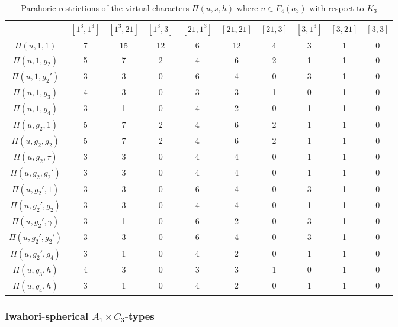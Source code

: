 \begin{landscape}
    \newpage
    \begin{table}[!ht]
        \centering
        {\small
        \begin{tabular}{|c|ccccccccc|}
            \hline
        & $[1^3,1^3]$ & $[1^3,21]$ & $[1^3,3]$ & $[21,1^3]$ & $[21,21]$ & $[21,3]$ & $[3,1^3]$ & $[3,21]$ & $[3,3]$ \\\hline
        $\Pi(u,1,1)$ & 7 & 15 & 12 & 6 & 12 & 4 & 3 & 1 & 0 \\
        $\Pi(u,1,g_2)$ & 5 & 7 & 2 & 4 & 6 & 2 & 1 & 1 & 0 \\
        $\Pi(u,1,g_2')$ & 3 & 3 & 0 & 6 & 4 & 0 & 3 & 1 & 0 \\
        $\Pi(u,1,g_3)$ & 4 & 3 & 0 & 3 & 3 & 1 & 0 & 1 & 0 \\
        $\Pi(u,1,g_4)$ & 3 & 1 & 0 & 4 & 2 & 0 & 1 & 1 & 0 \\\hline
        $\Pi(u,g_2,1)$ & 5 & 7 & 2 & 4 & 6 & 2 & 1 & 1 & 0 \\
        $\Pi(u,g_2,g_2)$ & 5 & 7 & 2 & 4 & 6 & 2 & 1 & 1 & 0 \\
        $\Pi(u,g_2,\tau)$ & 3 & 3 & 0 & 4 & 4 & 0 & 1 & 1 & 0 \\
        $\Pi(u,g_2,g_2')$ & 3 & 3 & 0 & 4 & 4 & 0 & 1 & 1 & 0 \\\hline
        $\Pi(u,g_2',1)$ & 3 & 3 & 0 & 6 & 4 & 0 & 3 & 1 & 0 \\
        $\Pi(u,g_2',g_2)$ & 3 & 3 & 0 & 4 & 4 & 0 & 1 & 1 & 0 \\
        $\Pi(u,g_2',\gamma)$ & 3 & 1 & 0 & 6 & 2 & 0 & 3 & 1 & 0 \\
        $\Pi(u,g_2',g_2')$  & 3 & 3 & 0 & 6 & 4 & 0 & 3 & 1 & 0 \\
        $\Pi(u,g_2',g_4)$  & 3 & 1 & 0 & 4 & 2 & 0 & 1 & 1 & 0 \\\hline
        $\Pi(u,g_3,h)$ & {4} & {3} & 0 & {3} & {3} & 1 & 0 & 1 & 0 \\\hline
        $\Pi(u,g_4,h)$ & 3 & 1 & 0 & 4 & 2 & 0 & 1 & 1 & 0 \\\hline
        \end{tabular}
        }
        \caption{Parahoric restrictions of the virtual characters $\Pi(u,s,h)$ where $u\in F_4(a_3)$ with respect to $K_3$}
    \end{table}

    \newpage

    \centering
    \subsubsection*{Iwahori-spherical \texorpdfstring{$A_1\times C_3$}{PDFstring}-types}


\end{landscape}
